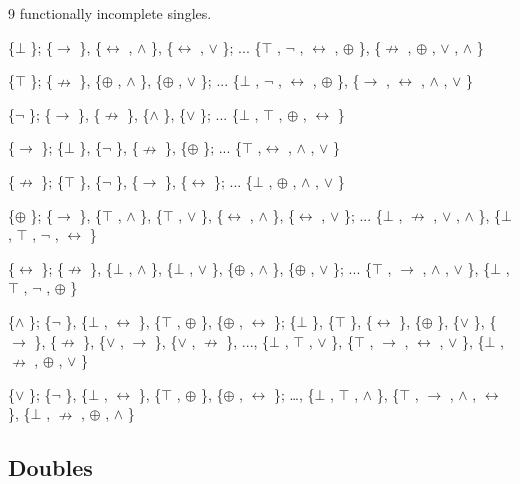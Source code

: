 9 functionally incomplete singles.

\{$\bot$ \}; \{$\to$ \}, \{$\leftrightarrow$ , $\land$ \}, \{$\leftrightarrow$ , $\lor$ \}; ... \{$\top$ , $\neg$ , $\leftrightarrow$ , $\oplus$ \}, \{$\nrightarrow$ , $\oplus$ , $\lor$ , $\land$ \}

\{$\top$ \}; \{$\nrightarrow$ \}, \{$\oplus$ , $\land$ \}, \{$\oplus$ , $\lor$ \}; ... \{$\bot$ , $\neg$ , $\leftrightarrow$ , $\oplus$ \}, \{$\to$ , $\leftrightarrow$ , $\land$ , $\lor$ \}

\{$\neg$ \}; \{$\to$ \}, \{$\nrightarrow$ \}, \{$\land$ \}, \{$\lor$ \}; ... \{$\bot$ , $\top$ , $\oplus$ , $\leftrightarrow$ \}

\{$\to$ \}; \{$\bot$ \}, \{$\neg$ \}, \{$\nrightarrow$ \}, \{$\oplus$ \}; ... \{$\top$ ,$\leftrightarrow$ , $\land$ , $\lor$ \}

\{$\nrightarrow$ \}; \{$\top$ \}, \{$\neg$ \}, \{$\to$ \}, \{$\leftrightarrow$ \}; ... \{$\bot$ , $\oplus$ , $\land$ , $\lor$ \}

\{$\oplus$ \}; \{$\to$ \}, \{$\top$ , $\land$ \}, \{$\top$ , $\lor$ \}, \{$\leftrightarrow$ , $\land$ \}, \{$\leftrightarrow$ , $\lor$ \}; ... \{$\bot$ , $\nrightarrow$ , $\lor$ ,
$\land$ \}, \{$\bot$ , $\top$ , $\neg$ , $\leftrightarrow$ \}

\{$\leftrightarrow$ \}; \{$\nrightarrow$ \}, \{$\bot$ , $\land$ \}, \{$\bot$ , $\lor$ \}, \{$\oplus$ , $\land$ \}, \{$\oplus$ , $\lor$ \}; ... \{$\top$ , $\to$ , $\land$ ,
$\lor$ \}, \{$\bot$ , $\top$ , $\neg$ , $\oplus$ \}

\{$\land$ \}; \{$\neg$ \}, \{$\bot$ , $\leftrightarrow$ \}, \{$\top$ , $\oplus$ \}, \{$\oplus$ , $\leftrightarrow$ \}; \{$\bot$ \}, \{$\top$ \}, \{$\leftrightarrow$ \}, \{$\oplus$ \},
\{$\lor$ \}, \{$\to$ \}, \{$\nrightarrow$ \}, \{$\lor$ , $\to$ \}, \{$\lor$ , $\nrightarrow$ \}, ..., \{$\bot$ , $\top$ , $\lor$ \}, \{$\top$ , $\to$ , $\leftrightarrow$ ,
$\lor$ \}, \{$\bot$ , $\nrightarrow$ , $\oplus$ , $\lor$ \}

\{$\lor$ \}; \{$\neg$ \}, \{$\bot$ , $\leftrightarrow$ \}, \{$\top$ , $\oplus$ \}, \{$\oplus$ , $\leftrightarrow$ \}; \ldots, \{$\bot$ , $\top$ , $\land$ \}, \{$\top$ , $\to$ ,
$\land$ , $\leftrightarrow$ \}, \{$\bot$ , $\nrightarrow$ , $\oplus$ , $\land$ \}

\hypertarget{doubles-1}{%
\subsection{Doubles}\label{doubles-1}}

